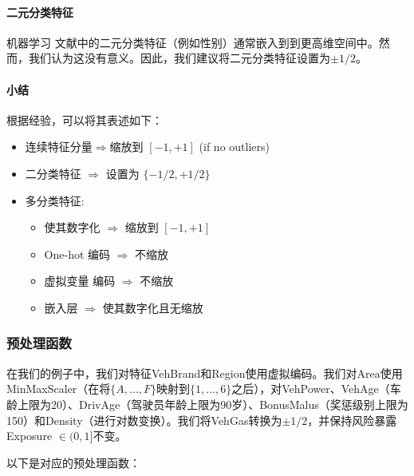 \documentclass[
]{article}
\providecommand{\tightlist}{%
  \setlength{\itemsep}{0pt}\setlength{\parskip}{0pt}}
\begin{document}
\paragraph{二元分类特征}\label{ux4e8cux5143ux5206ux7c7bux7279ux5f81}

机器学习
文献中的二元分类特征（例如性别）通常嵌入到到更高维空间中。然而，我们认为这没有意义。因此，我们建议将二元分类特征设置为\(\pm 1/2\)。

\paragraph{小结}\label{ux5c0fux7ed3}

根据经验，可以将其表述如下：

\begin{itemize}
\tightlist
\item
  连续特征分量\(\Rightarrow\)缩放到 \([-1,+1]\) (if no outliers)
\item
  二分类特征 \(\Rightarrow\) 设置为 \(\{-1/2,+1/2 \}\)
\item
  多分类特征:

  \begin{itemize}
  \tightlist
  \item
    使其数字化 \(\Rightarrow\) 缩放到 \([-1,+1]\)
  \item
    One-hot 编码 \(\Rightarrow\) 不缩放
  \item
    虚拟变量 编码 \(\Rightarrow\) 不缩放
  \item
    嵌入层 \(\Rightarrow\) 使其数字化且无缩放
  \end{itemize}
\end{itemize}

\subsubsection{预处理函数}\label{ux9884ux5904ux7406ux51fdux6570}

在我们的例子中，我们对特征VehBrand和Region使用虚拟编码。我们对Area使用MinMaxScaler（在将\(\{A,...,F\}\)映射到\(\{1,...,6\}\)之后），对VehPower、VehAge（车龄上限为20）、DrivAge（驾驶员年龄上限为90岁）、BonusMalus（奖惩级别上限为150）和Density（进行对数变换）。我们将VehGas转换为\(\pm 1/2\)，并保持风险暴露Exposure
\(\in (0,1]\)不变。

以下是对应的预处理函数：
\end{document}
